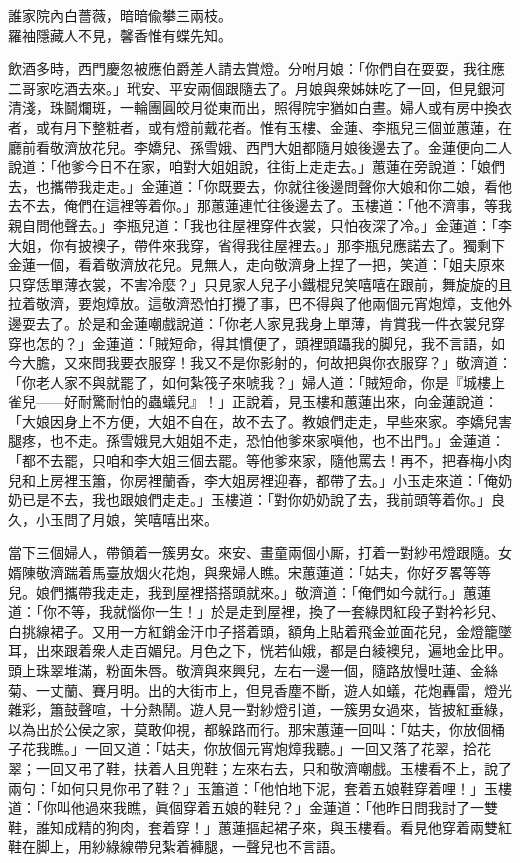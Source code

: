 \begin{myquote} 
誰家院內白薔薇，暗暗偸攀三兩枝。\\羅袖隱藏人不見，馨香惟有蝶先知。
\end{myquote} 

飲酒多時，西門慶忽被應伯爵差人請去賞燈。分咐月娘：「你們自在耍耍，我往應二哥家吃酒去來。」玳安、平安兩個跟隨去了。月娘與衆姊妹吃了一回，但見銀河清淺，珠鬬爛斑，一輪團圓皎月從東而出，照得院宇猶如白晝。婦人或有房中換衣者，或有月下整粧者，或有燈前戴花者。惟有玉樓、金蓮、李瓶兒三個並蕙蓮，在廳前看敬濟放花兒。李嬌兒、孫雪娥、西門大姐都隨月娘後邊去了。金蓮便向二人說道：「他爹今日不在家，咱對大姐姐說，往街上走走去。」蕙蓮在旁說道：「娘們去，也攜帶我走走。」金蓮道：「你既要去，你就往後邊問聲你大娘和你二娘，看他去不去，俺們在這裡等着你。」那蕙蓮連忙往後邊去了。玉樓道：「他不濟事，等我親自問他聲去。」李瓶兒道：「我也往屋裡穿件衣裳，只怕夜深了冷。」金蓮道：「李大姐，你有披襖子，帶件來我穿，省得我往屋裡去。」{}那李瓶兒應諾去了。{}獨剩下金蓮一個，看着敬濟放花兒。見無人，走向敬濟身上捏了一把，{}笑道：「姐夫原來只穿恁單薄衣裳，不害冷麼？」只見家人兒子小鐵棍兒笑嘻嘻在跟前，舞旋旋的且拉着敬濟，要炮𤍤放。{}這敬濟恐怕打攪了事，巴不得與了他兩個元宵炮𤍤，支他外邊耍去了。於是和金蓮嘲戲說道：「你老人家見我身上單薄，肯賞我一件衣裳兒穿穿也怎的？」金蓮道：「賊短命，得其慣便了，頭裡頭躡我的脚兒，我不言語，如今大膽，又來問我要衣服穿！我又不是你影射的，何故把與你衣服穿？」敬濟道：「你老人家不與就罷了，如何紮筏子來唬我？」婦人道：「賊短命，你是『城樓上雀兒——好耐驚耐怕的蟲蟻兒』！」正說着，見玉樓和蕙蓮出來，向金蓮說道：「大娘因身上不方便，大姐不自在，故不去了。教娘們走走，早些來家。李嬌兒害腿疼，也不走。孫雪娥見大姐姐不走，恐怕他爹來家嗔他，也不出門。」金蓮道：「都不去罷，只咱和李大姐三個去罷。等他爹來家，隨他罵去！再不，把春梅小肉兒和上房裡玉簫，你房裡蘭香，李大姐房裡迎春，都帶了去。」小玉走來道：「俺奶奶已是不去，我也跟娘們走走。」玉樓道：「對你奶奶說了去，我前頭等着你。」良久，小玉問了月娘，笑嘻嘻出來。

當下三個婦人，帶領着一簇男女。來安、畫童兩個小厮，打着一對紗弔燈跟隨。女婿陳敬濟踹着馬臺放烟火花炮，與衆婦人瞧。宋蕙蓮道：「姑夫，你好歹畧等等兒。娘們攜帶我走走，我到屋裡搭搭頭就來。」敬濟道：「俺們如今就行。」蕙蓮道：「你不等，我就惱你一生！」{}於是走到屋裡，換了一套綠閃紅段子對衿衫兒、白挑線裙子。又用一方紅銷金汗巾子搭着頭，額角上貼着飛金並面花兒，金燈籠墜耳，出來跟着衆人走百媚兒。月色之下，恍若仙娥，都是白綾襖兒，遍地金比甲。頭上珠翠堆滿，粉面朱唇。敬濟與來興兒，左右一邊一個，隨路放慢吐蓮、金絲菊、一丈蘭、賽月明。出的大街市上，但見香塵不斷，遊人如蟻，花炮轟雷，燈光雜彩，簫鼓聲喧，十分熱鬧。遊人見一對紗燈引道，一簇男女過來，皆披紅垂綠，以為出於公侯之家，莫敢仰視，都躲路而行。那宋蕙蓮一回叫：「姑夫，你放個桶子花我瞧。」一回又道：「姑夫，你放個元宵炮𤍤我聽。」一回又落了花翠，拾花翠；一回又弔了鞋，扶着人且兜鞋；左來右去，只和敬濟嘲戲。{}玉樓看不上，說了兩句：「如何只見你弔了鞋？」玉簫道：「他怕地下泥，套着五娘鞋穿着哩！」{}玉樓道：「你叫他過來我瞧，眞個穿着五娘的鞋兒？」金蓮道：「他昨日問我討了一雙鞋，誰知成精的狗肉，套着穿！」蕙蓮摳起裙子來，與玉樓看。看見他穿着兩雙紅鞋在脚上，用紗綠線帶兒紮着褲腿，一聲兒也不言語。

